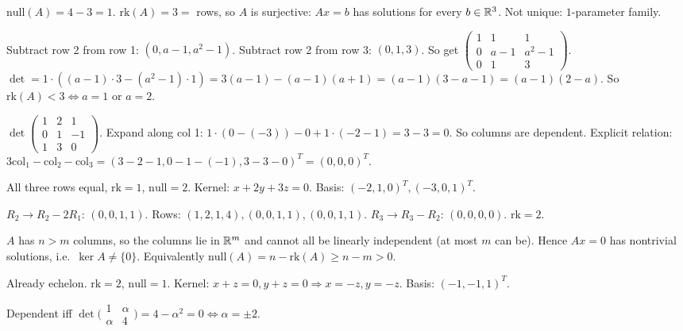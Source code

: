 \begin{solutions}
    \item $\mathrm{null}(A) = 4 - 3 = 1$. $\mathrm{rk}(A) = 3 = $ rows, so $A$ is surjective: $A x = b$ has solutions for every $b \in \mathbb{R}^{3}$. Not unique: $1$-parameter family.

    \item Subtract row 2 from row 1: $(0, a - 1, a^{2} - 1)$. Subtract row 2 from row 3: $(0, 1, 3)$. So get $\begin{pmatrix} 1 & 1 & 1 \\ 0 & a - 1 & a^{2} - 1 \\ 0 & 1 & 3 \end{pmatrix}$. $\det = 1 \cdot ((a-1) \cdot 3 - (a^{2} - 1) \cdot 1) = 3(a - 1) - (a - 1)(a + 1) = (a - 1)(3 - a - 1) = (a - 1)(2 - a)$. So $\mathrm{rk}(A) < 3 \Leftrightarrow a = 1$ or $a = 2$.

    \item $\det \begin{pmatrix} 1 & 2 & 1 \\ 0 & 1 & -1 \\ 1 & 3 & 0 \end{pmatrix}$. Expand along col 1: $1 \cdot (0 - (-3)) - 0 + 1 \cdot (-2 - 1) = 3 - 3 = 0$. So columns are dependent. Explicit relation: $3 \mathrm{col}_{1} - \mathrm{col}_{2} - \mathrm{col}_{3} = (3 - 2 - 1, 0 - 1 - (-1), 3 - 3 - 0)^{T} = (0, 0, 0)^{T}$.

    \item All three rows equal, $\mathrm{rk} = 1$, $\mathrm{null} = 2$. Kernel: $x + 2 y + 3 z = 0$. Basis: $(-2, 1, 0)^{T}, (-3, 0, 1)^{T}$.

    \item $R_{2} \to R_{2} - 2 R_{1}$: $(0, 0, 1, 1)$. Rows: $(1, 2, 1, 4), (0, 0, 1, 1), (0, 0, 1, 1)$. $R_{3} \to R_{3} - R_{2}$: $(0, 0, 0, 0)$. $\mathrm{rk} = 2$.

    \item $A$ has $n > m$ columns, so the columns lie in $\mathbb{R}^{m}$ and cannot all be linearly independent (at most $m$ can be). Hence $A x = 0$ has nontrivial solutions, i.e.\ $\ker A \neq \{0\}$. Equivalently $\mathrm{null}(A) = n - \mathrm{rk}(A) \ge n - m > 0$.

    \item Already echelon. $\mathrm{rk} = 2$, $\mathrm{null} = 1$. Kernel: $x + z = 0, y + z = 0 \Rightarrow x = -z, y = -z$. Basis: $(-1, -1, 1)^{T}$.

    \item Dependent iff $\det\bigl(\begin{smallmatrix} 1 & \alpha \\ \alpha & 4 \end{smallmatrix}\bigr) = 4 - \alpha^{2} = 0 \Leftrightarrow \alpha = \pm 2$.


\end{solutions}
